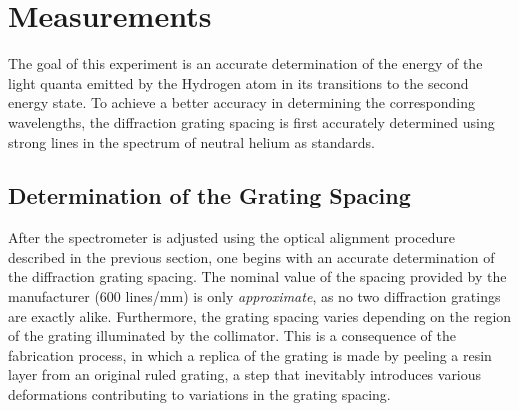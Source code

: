 \documentclass[12pt]{article}
\begin{document}
\newpage
\section{Measurements}
The goal of this experiment is an accurate determination of the energy of the light quanta emitted by the Hydrogen atom in its transitions to the second energy state. To achieve a better accuracy in determining the corresponding wavelengths, the diffraction grating spacing is first accurately determined using strong lines in the spectrum of neutral helium as standards.

\subsection{Determination of the Grating Spacing}
After the spectrometer is adjusted using the optical alignment procedure described in the previous section, one begins with an accurate determination of the diffraction grating spacing. The nominal value of the spacing provided by the manufacturer (600 lines/mm) is only \textit{approximate}, as no two diffraction gratings are exactly alike. Furthermore, the grating spacing varies depending on the region of the grating illuminated by the collimator. This is a consequence of the fabrication process, in which a replica of the grating is made by peeling a resin layer from an original ruled grating, a step that inevitably introduces various deformations contributing to variations in the grating spacing.
\end{document}
